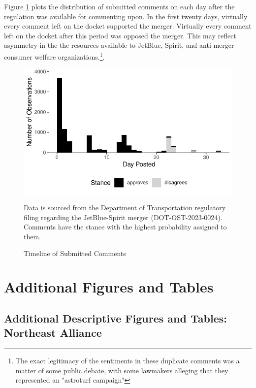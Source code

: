 \documentclass{article}
\begin{document}
\begin{appendices}
Figure \ref{fig:CommentTimeline} plots the distribution of submitted comments on each day after the regulation was available for commenting upon. In the first twenty days, virtually every comment left on the docket supported the merger. Virtually every comment left on the docket after this period was opposed the merger. This may reflect asymmetry in the the resources available to JetBlue, Spirit, and anti-merger consumer welfare organizations.\footnote{The exact legitimacy of the sentiments in these duplicate comments was a matter of some public debate, with some lawmakers alleging that they represented an "astroturf campaign"\citep{birnbaum_elizabeth_2023}}.  

    \begin{figure}[h]
		\caption{Timeline of Submitted Comments}
		\label{fig:CommentTimeline}
		\includegraphics{stance_submission_timeline}
		\begin{minipage}{\textwidth} 
			{\footnotesize Data is sourced from the Department of Transportation regulatory filing regarding the JetBlue-Spirit merger  (DOT-OST-2023-0024). Comments have the stance with the highest probability assigned to them.} 
		\end{minipage}
	\end{figure}
	
	
	

	\FloatBarrier
	\pagebreak
	\section{Additional Figures and Tables}	

	\subsection{Additional Descriptive Figures and Tables: Northeast Alliance}
	

\end{appendices}
\end{document}
